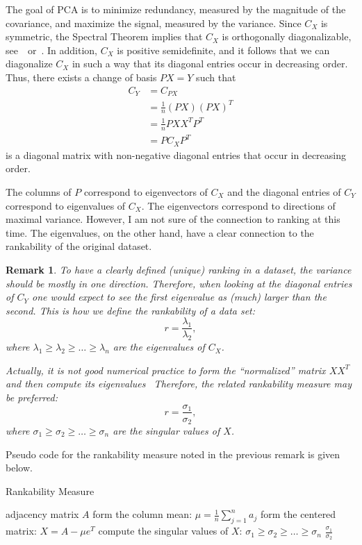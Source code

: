 \documentclass{article}
\newtheorem{remark}[theorem]{Remark}
\begin{document}
The goal of PCA is to minimize redundancy, measured by the magnitude of the covariance, and maximize the signal, measured by the variance.
Since $C_{X}$ is symmetric, the Spectral Theorem implies that $C_{X}$ is orthogonally diagonalizable, see~\cite[Section 7.1]{Lay}~or~\cite[Section 6.6]{Friedberg}.
In addition, $C_{X}$ is positive semidefinite, and it follows that we can diagonalize $C_{X}$ in such a way that its diagonal entries occur in decreasing order. 
Thus, there exists a change of basis $PX=Y$ such that 
\begin{align*}
C_{Y} &= C_{PX} \\
&= \frac{1}{n}(PX)(PX)^{T} \\
&= \frac{1}{n}PXX^{T}P^{T} \\
&= PC_{X}P^{T}
\end{align*}
is a diagonal matrix with non-negative diagonal entries that occur in decreasing order. 

The columns of $P$ correspond to eigenvectors of $C_{X}$ and the diagonal entries of $C_{Y}$ correspond to eigenvalues of $C_{X}$. 
The eigenvectors correspond to directions of maximal variance. However, I am not sure of the connection to ranking at this time.
The eigenvalues, on the other hand, have a clear connection to the rankability of the original dataset. 

\begin{remark}\label{rem: rank_measure}
To have a clearly defined (unique) ranking in a dataset, the variance should be mostly in one direction.
Therefore, when looking at the diagonal entries of $C_{Y}$ one would expect to see the first eigenvalue as (much) larger than the second. 
This is how we define the rankability of a data set:
\[
r=\frac{\lambda_{1}}{\lambda_{2}},
\]
where $\lambda_{1}\geq\lambda_{2}\geq\ldots\geq\lambda_{n}$ are the eigenvalues of $C_{X}$.

Actually, it is not good numerical practice to form the ``normalized'' matrix $XX^{T}$ and then compute its eigenvalues~\cite[Section 5.8]{Watkins} 
Therefore, the related rankability measure may be preferred:
\[
r=\frac{\sigma_{1}}{\sigma_{2}},
\]
where $\sigma_{1}\geq\sigma_{2}\geq\ldots\geq\sigma_{n}$ are the singular values of $X$. 
\end{remark}

Pseudo code for the rankability measure noted in the previous remark is given below. 

\begin{algorithm}[h]
\caption{Rankability Measure}
\begin{algorithmic}
\REQUIRE adjacency matrix $A$
\STATE form the column mean: $\mu=\frac{1}{n}\sum_{j=1}^{n}a_{j}$
\STATE form the centered matrix: $X=A-\mu e^{T}$
\STATE compute the singular values of $X$: $\sigma_{1}\geq\sigma_{2}\geq\ldots\geq\sigma_{n}$
\RETURN $\frac{\sigma_{1}}{\sigma_{2}}$
\end{algorithmic}
\label{alg: rankability}
\end{algorithm}
\end{document}
